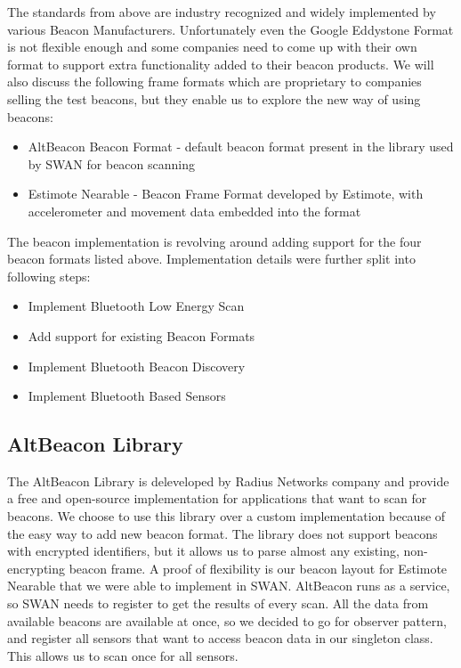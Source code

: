 The standards from above are industry recognized and widely implemented by various Beacon Manufacturers.
Unfortunately even the Google Eddystone Format is not flexible enough and some companies need to come up with their own format to support extra functionality 
added to  their beacon products. We will also discuss the following frame formats which are proprietary to companies selling the test beacons, but they enable us to explore the
new way of using beacons:
\begin{itemize}
 \item AltBeacon Beacon Format - default beacon format present in the library used by SWAN for beacon scanning
 \item Estimote Nearable - Beacon Frame Format developed by Estimote\cite{estimote_company}, with accelerometer and movement data embedded into the format
\end{itemize}

The beacon implementation is revolving around adding support for the four beacon formats listed above. Implementation details were further split into 
following steps:
\begin{itemize}
 \item Implement Bluetooth Low Energy Scan
 \item Add support for existing Beacon Formats
 \item Implement Bluetooth Beacon Discovery
 \item Implement Bluetooth Based Sensors
\end{itemize}

\subsection{AltBeacon Library}
The AltBeacon Library is deleveloped by Radius Networks company and provide a free and open-source implementation for applications that want to scan for beacons.
We choose to use this library over a custom implementation because of the easy way to add new beacon format. The library does not support beacons with encrypted 
identifiers, but it allows us to parse almost any existing, non-encrypting beacon frame. A proof of flexibility is our beacon layout for Estimote Nearable that we were able to 
implement in SWAN.
AltBeacon runs as a service, so SWAN needs to register to get the results of every scan. All the data from available beacons are available at once, so we decided to go for observer 
pattern, and register all sensors that want to access beacon data in our singleton class. This allows us to scan once for all sensors.


